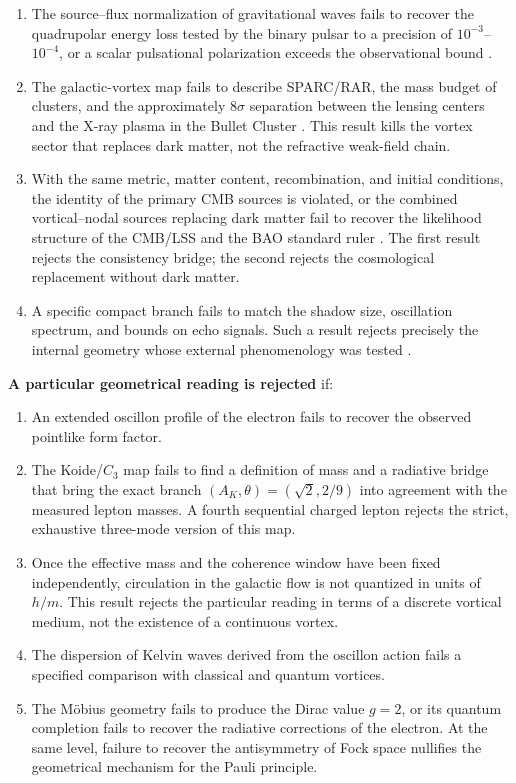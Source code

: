 \documentclass[11pt,a4paper]{article}
\begin{document}
\begin{enumerate}
\item The source--flux normalization of gravitational waves fails to recover the quadrupolar energy loss tested by the binary pulsar to a precision of $10^{-3}$--$10^{-4}$, or a scalar pulsational polarization exceeds the observational bound \citep{kramer2021,ligovirgokagra2022}.
\item The galactic-vortex map fails to describe SPARC/RAR, the mass budget of clusters, and the approximately $8\sigma$ separation between the lensing centers and the X-ray plasma in the Bullet Cluster \citep{clowe2006}. This result kills the vortex sector that replaces dark matter, not the refractive weak-field chain.
\item With the same metric, matter content, recombination, and initial conditions, the identity of the primary CMB sources is violated, or the combined vortical--nodal sources replacing dark matter fail to recover the likelihood structure of the CMB/LSS and the BAO standard ruler \citep{eisenstein2005}. The first result rejects the consistency bridge; the second rejects the cosmological replacement without dark matter.
\item A specific compact branch fails to match the shadow size, oscillation spectrum, and bounds on echo signals. Such a result rejects precisely the internal geometry whose external phenomenology was tested \citep{eventhorizon2019,cardoso2019}.
\end{enumerate}

\textbf{A particular geometrical reading is rejected} if:

\begin{enumerate}
\item An extended oscillon profile of the electron fails to recover the observed pointlike form factor.
\item The Koide/$C_3$ map fails to find a definition of mass and a radiative bridge that bring the exact branch $(A_K,\theta)=(\sqrt2,2/9)$ into agreement with the measured lepton masses. A fourth sequential charged lepton rejects the strict, exhaustive three-mode version of this map.
\item Once the effective mass and the coherence window have been fixed independently, circulation in the galactic flow is not quantized in units of $h/m$. This result rejects the particular reading in terms of a discrete vortical medium, not the existence of a continuous vortex.
\item The dispersion of Kelvin waves derived from the oscillon action fails a specified comparison with classical and quantum vortices.
\item The Möbius geometry fails to produce the Dirac value $g=2$, or its quantum completion fails to recover the radiative corrections of the electron. At the same level, failure to recover the antisymmetry of Fock space nullifies the geometrical mechanism for the Pauli principle.
\end{enumerate}
\end{document}
